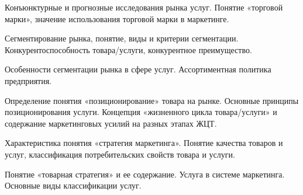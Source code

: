 \documentclass[
	14pt,
	a4paper,
	]
	{scrartcl}
\begin{document}
\vfill

\newpage


\shapk
{}
\setcounter{zad}{0}

\vfill
\z Конъюнктурные и прогнозные исследования рынка услуг.
 \vfill
\z Понятие «торговой марки», значение использования торговой марки в маркетинге.
 \vfill

\vfill

\newpage


\shapk
{}
\setcounter{zad}{0}

\vfill
\z Сегментирование рынка, понятие, виды и критерии сегментации.
 \vfill
\z Конкурентоспособность товара/услуги, конкурентное преимущество.
 \vfill

\vfill

\newpage


\shapk
{}
\setcounter{zad}{0}

\vfill
\z Особенности сегментации рынка в сфере услуг.
 \vfill
\z Ассортиментная политика предприятия.
 \vfill

\vfill

\newpage


\shapk
{}
\setcounter{zad}{0}

\vfill
\z Определение понятия «позиционирование» товара на рынке. Основные принципы позиционирования услуги.
 \vfill
\z Концепция «жизненного цикла товара/услуги» и содержание маркетинговых усилий на разных этапах ЖЦТ.
 \vfill

\vfill

\newpage


\shapk
{}
\setcounter{zad}{0}

\vfill
\z Характеристика понятия «стратегия маркетинга».
 \vfill
\z Понятие качества товаров и услуг, классификация потребительских свойств товара и услуги.
 \vfill

\vfill

\newpage


\shapk
{}
\setcounter{zad}{0}

\vfill
\z Понятие «товарная стратегия» и ее содержание.
 \vfill
\z Услуга в системе маркетинга. Основные виды классификации услуг.
 \vfill

\vfill

\newpage
\end{document}
